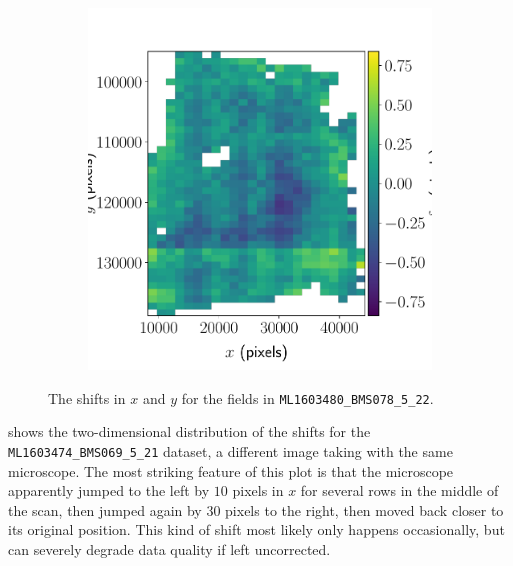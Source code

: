 \documentclass{article}
\begin{document}
\begin{figure}[ht]
\begin{subfigure}{0.49\linewidth}
		\includegraphics[width=\linewidth]{2D-shifts-BMS-y}
		\caption{}
		\label{fig:2DBMSy}
	\end{subfigure}
	\caption{The shifts in  $x$ and  $y$ for the fields in \texttt{ML1603480\_BMS078\_5\_22}.}
	\label{fig:2DBMS}
\end{figure}

 shows the two-dimensional distribution of the shifts for the \texttt{ML1603474\_BMS069\_5\_21} dataset, a different image taking with the same microscope.  The most striking feature of this plot is that the microscope apparently jumped to the left by $10$ pixels in $x$ for several rows in the middle of the scan, then jumped again by $30$ pixels to the right, then moved back closer to its original position.  This kind of shift most likely only happens occasionally, but can severely degrade data quality if left uncorrected.
\end{document}
